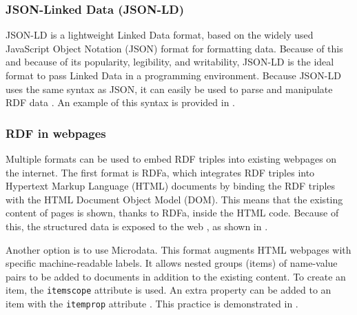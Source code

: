 

\subsubsection{JSON-Linked Data (JSON-LD)}\label{sssec:formatting-jsonld}
JSON-LD is a lightweight Linked Data format, based on the widely used JavaScript Object Notation (JSON) format for formatting data. Because of this and because of its popularity, legibility, and writability, JSON-LD is the ideal format to pass Linked Data in a programming environment. Because JSON-LD uses the same syntax as JSON, it can easily be used to parse and manipulate RDF data \cite{sporny2012json}. An example of this syntax is provided in .

\clearpage



\subsubsection{RDF in webpages}
Multiple formats can be used to embed RDF triples into existing webpages on the internet. The first format is RDFa, which integrates RDF triples into Hypertext Markup Language (HTML) documents by binding the RDF triples with the HTML Document Object Model (DOM). This means that the existing content of pages is shown, thanks to RDFa, inside the HTML code. Because of this, the structured data is exposed to the web \cite{herman2015rdfa}, as shown in .



\noindent Another option is to use Microdata. This format augments HTML webpages with specific machine-readable labels. It allows nested groups (items) of name-value pairs to be added to documents in addition to the existing content. To create an item, the \texttt{itemscope} attribute is used. An extra property can be added to an item with the \texttt{itemprop} attribute \cite{microdata}. This practice is demonstrated in .

